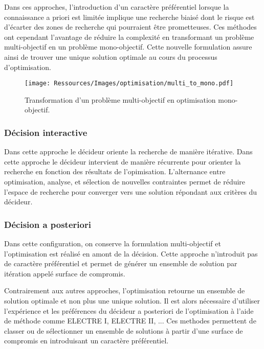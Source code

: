 Dans ces approches, l’introduction d’un caractère préférentiel lorsque la connaissance a priori
est limitée implique une recherche biaisé dont le risque est d’écarter des zones
de recherche qui pourraient être prometteuses. Ces méthodes ont cependant l’avantage
de réduire la complexité en transformant un problème multi-objectif en un problème
mono-objectif. Cette nouvelle formulation assure ainsi de trouver une unique solution
optimale au cours du processus d’optimisation.

\begin{figure}
    \begin{center}
        \texttt{[image: Ressources/Images/optimisation/multi\_to\_mono.pdf]}
    \end{center}
    \caption{Transformation d’un problème multi-objectif en optimisation mono-objectif.
             \label{fig:multi_to_mono}}
\end{figure}


\subsubsection{Décision interactive} %
\label{ssub:decision_interactive}
Dans cette approche le décideur oriente la recherche de manière itérative. Dans cette
approche le décideur intervient de manière récurrente pour orienter la recherche
en fonction des résultats de l’opimisation. L’alternance entre optimisation,
analyse, et sélection de nouvelles contraintes permet de réduire l’espace de
recherche pour converger vers une solution répondant aux critères du décideur.



\subsubsection{Décision a posteriori} %
\label{ssub:decision_a_posteriori}
Dans cette configuration, on conserve la formulation multi-objectif et l’optimisation
est réalisé en amont de la décision. Cette approche n’introduit pas de
caractère préférentiel et permet de générer un ensemble de solution par itération
appelé surface de compromis.


Contrairement aux autres approches, l’optimisation retourne un ensemble de solution
optimale et non plus une unique solution. Il est alors nécessaire d’utiliser
l’expérience et les préférences du décideur a posteriori de l’optimisation
à l’aide de méthode comme ELECTRE I, ELECTRE II, ...
Ces methodes permettent de classer ou de sélectionner un ensemble de solutions
à partir d’une surface de compromis en introduisant un caractère préférentiel.

